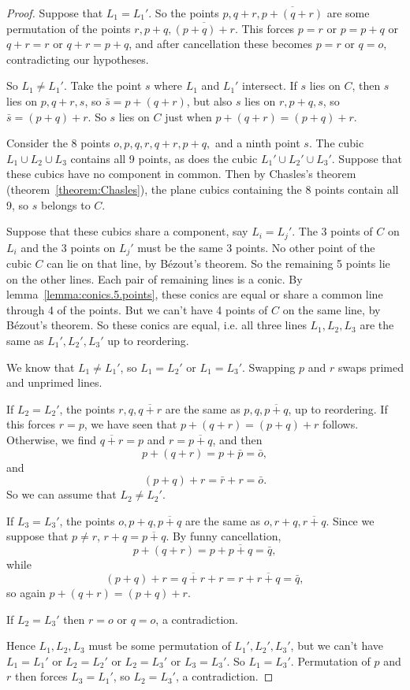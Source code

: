 \begin{proof}
Suppose that \(L_1 = L_1'\).
So the points \(p,q+r,\overline{p+(q+r)}\) are some permutation of the points \(r,p+q,\overline{(p+q)+r}\).
This forces \(p=r\) or \(p=p+q\) or \(q+r=r\) or \(q+r=p+q\), and after cancellation these becomes \(p=r\) or \(q=o\), contradicting our hypotheses.

So \(L_1 \ne L_1'\).
Take the point \(s\) where \(L_1\) and \(L_1'\) intersect.
If \(s\) lies on \(C\), then \(s\) lies on \(p,q+r,s\), so \(\bar{s}=p+(q+r)\), but also \(s\) lies on \(r,p+q,s\), so \(\bar{s}=(p+q)+r\).
So \(s\) lies on \(C\) just when \(p+(q+r)=(p+q)+r\).

Consider the 8 points \(o,p,q,r,q+r,p+q,\) and a ninth point \(s\).
The cubic \(L_1 \cup L_2 \cup L_3\) contains all 9 points, as does the cubic \(L_1' \cup L_2' \cup L_3'\).
Suppose that these cubics have no component in common.
Then by Chasles's theorem (theorem~\vref{theorem:Chasles}), the plane cubics containing the 8 points contain all 9, so \(s\) belongs to \(C\).

Suppose that these cubics share a component, say \(L_i = L_j'\).
The 3 points of \(C\) on \(L_i\) and the 3 points on \(L_j'\) must be the same 3 points.
No other point of the cubic \(C\) can lie on that line, by B\'ezout's theorem.
So the remaining 5 points lie on the other lines.
Each pair of remaining lines is a conic.
By lemma~\vref{lemma:conics.5.points}, these conics are equal or share a common line through 4 of the points.
But we can't have 4 points of \(C\) on the same line, by B\'ezout's theorem.
So these conics are equal, i.e. all three lines \(L_1,L_2,L_3\) are the same as \(L_1',L_2',L_3'\) up to reordering.

We know that \(L_1 \ne L_1'\), so \(L_1=L_2'\) or \(L_1=L_3'\).
Swapping \(p\) and \(r\) swaps primed and unprimed lines.

If \(L_2=L_2'\), the points \(r,q,\overline{q+r}\) are the same as \(p,q,\overline{p+q}\), up to reordering.
If this forces \(r=p\), we have seen that \(p+(q+r)=(p+q)+r\) follows.
Otherwise, we find \(\overline{q+r}=p\) and \(r=\overline{p+q}\), and then
\[
p+(q+r)=p+\bar{p}=\bar{o},
\]
and
\[
(p+q)+r=\bar{r}+r=\bar{o}.
\]
So we can assume that \(L_2 \ne L_2'\).

If \(L_3=L_3'\), the points \(o,p+q,\overline{p+q}\) are the same as \(o,r+q,\overline{r+q}\).
Since we suppose that \(p \ne r\), \(r+q=\overline{p+q}\).
By funny cancellation,
\[
p+(q+r)=p+\overline{p+q}=\bar{q},
\]
while
\[
(p+q)+r=\overline{q+r}+r=r+\overline{r+q}=\bar{q},
\]
so again \(p+(q+r)=(p+q)+r\).

If \(L_2=L_3'\) then \(r=o\) or \(q=o\), a contradiction.

Hence \(L_1, L_2, L_3\) must be some permutation of \(L_1',L_2',L_3'\), but we can't have \(L_1=L_1'\) or \(L_2=L_2'\) or \(L_2=L_3'\) or \(L_3=L_3'\).
So \(L_1=L_3'\).
Permutation of \(p\) and \(r\) then forces \(L_3=L_1'\), so \(L_2=L_3'\), a contradiction.
\end{proof}



